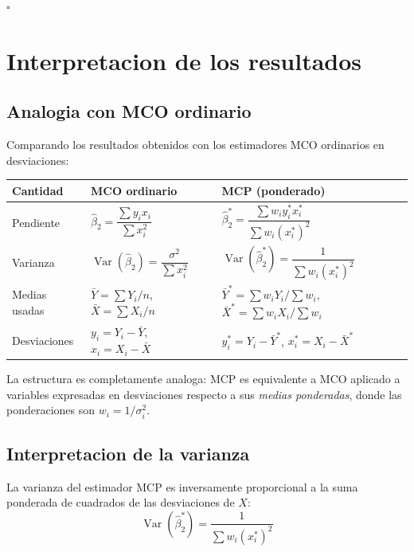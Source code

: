 \documentclass[12pt, letterpaper]{article}
\theoremstyle{remark}
\newcommand{\Var}{\operatorname{Var}}
\newcommand{\Ybar}{\bar{Y}^*}
\newcommand{\Xbar}{\bar{X}^*}
\newcommand{\ystar}{y_i^*}
\newcommand{\xstar}{x_i^*}
\begin{document}
\hfill$\square$

\section{Interpretacion de los resultados}

\subsection{Analogia con MCO ordinario}

Comparando los resultados obtenidos con los estimadores MCO ordinarios en
desviaciones:

\begin{center}
\small
\begin{tabular}{p{4.5cm} p{5cm} p{4.5cm}}
\toprule
\textbf{Cantidad}
  & \textbf{MCO ordinario}
  & \textbf{MCP (ponderado)} \\
\midrule
Pendiente
  & $\hat\beta_2 = \dfrac{\sum y_i x_i}{\sum x_i^2}$
  & $\hat\beta_2^* = \dfrac{\sum w_i \ystar \xstar}{\sum w_i (\xstar)^2}$ \\[10pt]
Varianza
  & $\Var(\hat\beta_2) = \dfrac{\sigma^2}{\sum x_i^2}$
  & $\Var(\hat\beta_2^*) = \dfrac{1}{\sum w_i (\xstar)^2}$ \\[10pt]
Medias usadas
  & $\bar Y = \sum Y_i/n$, $\bar X = \sum X_i/n$
  & $\Ybar = \sum w_i Y_i/\sum w_i$, $\Xbar = \sum w_i X_i/\sum w_i$ \\[6pt]
Desviaciones
  & $y_i = Y_i - \bar Y$, $x_i = X_i - \bar X$
  & $\ystar = Y_i - \Ybar$, $\xstar = X_i - \Xbar$ \\
\bottomrule
\end{tabular}
\end{center}

\vspace{6pt}

La estructura es completamente analoga: MCP es equivalente a MCO aplicado a
variables expresadas en desviaciones respecto a sus \emph{medias ponderadas},
donde las ponderaciones son $w_i = 1/\sigma_i^2$.

\subsection{Interpretacion de la varianza}

La varianza del estimador MCP es inversamente proporcional a la suma ponderada
de cuadrados de las desviaciones de $X$:
\begin{equation}
  \Var(\hat\beta_2^*) = \frac{1}{\sum w_i (\xstar)^2}
\end{equation}
\end{document}
